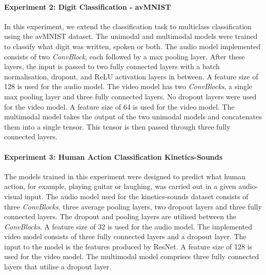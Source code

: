 \paragraph{\textbf{Experiment 2: Digit Classification - avMNIST}} In this experiment, we extend the classification task to multiclass classification using the avMNIST dataset. The unimodal and multimodal models were trained to classify what digit was written, spoken or both. The audio model implemented consists of two \textit{ConvBlock}, each followed by a max pooling layer. After these layers, the input is passed to two fully connected layers with a batch normalisation, dropout, and ReLU activation layers in between. A feature size of 128 is used for the audio model. The video model has two \textit{ConvBlocks}, a single max pooling layer and three fully connected layers. No dropout layers were used for the video model. A feature size of 64 is used for the video model. The multimodal model takes the output of the two unimodal models and concatenates them into a single tensor. This tensor is then passed through three fully connected layers. 

\paragraph{\textbf{Experiment 3: Human Action Classification Kinetics-Sounds}} The models trained in this experiment were designed to predict what human action, for example, playing guitar or laughing, was carried out in a given audio-visual input. The audio model used for the kinetics-sounds dataset consists of three \textit{ConvBlocks}, three average pooling layers, two dropout layers and three fully connected layers. The dropout and pooling layers are utilised between the \textit{ConvBlocks}. A feature size of 32 is used for the audio model. The implemented video model consists of three fully connected layers and a dropout layer. The input to the model is the features produced by ResNet. A feature size of 128 is used for the video model. The multimodal model comprises three fully connected layers that utilise a dropout layer.


